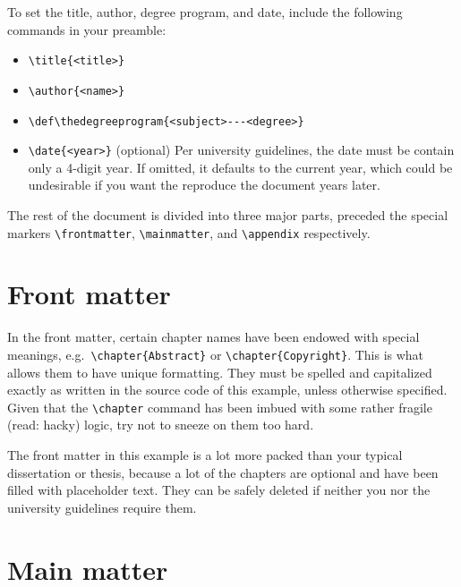 \documentclass[dissertation]{msudissertation}
\def\thedegreeprogram{Physics---Doctor of Philosophy}
\begin{document}
To set the title, author, degree program, and date, include the following commands in your preamble:
\begin{itemize}
\item \verb|\title{<title>}|
\item \verb|\author{<name>}|
\item \verb|\def\thedegreeprogram{<subject>---<degree>}|
\item \verb|\date{<year>}| (optional)  Per university guidelines, the date must be contain only a 4-digit year.  If omitted, it defaults to the current year, which could be undesirable if you want the reproduce the document years later.
\end{itemize}

The rest of the document is divided into three major parts, preceded the special markers \verb|\frontmatter|, \verb|\mainmatter|, and \verb|\appendix| respectively.

\section{Front matter}

In the front matter, certain chapter names have been endowed with special meanings, e.g.\ \verb|\chapter{Abstract}| or \verb|\chapter{Copyright}|.  This is what allows them to have unique formatting.  They must be spelled and capitalized exactly as written in the source code of this example, unless otherwise specified.  Given that the \verb|\chapter| command has been imbued with some rather fragile (read: hacky) logic, try not to sneeze on them too hard.

The front matter in this example is a lot more packed than your typical dissertation or thesis, because a lot of the chapters are optional and have been filled with placeholder text.  They can be safely deleted if neither you nor the university guidelines require them.

\section{Main matter}
\end{document}
